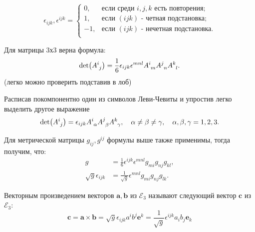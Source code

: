 \begin{definition}
	\begin{equation*}
		\epsilon_{ijk},\epsilon^{ijk} = \begin{cases}
			0, &\text{если среди $i,j,k$ есть повторения};\\
			1, &\text{если $(ijk)$ - четная подстановка};\\
			-1,&\text{если $(ijk)$ - нечетная подстановка}.\\
		\end{cases}
	\end{equation*}
\end{definition}

\begin{definition}[Определитель]
	Для матрицы 3х3 верна формула:
	\begin{equation*}
		\det(\tensor{A}{^i_j}) = \frac{1}{6}\epsilon_{ijk}\epsilon^{mnl}\tensor{A}{^i_m}\tensor{A}{^j_n}\tensor{A}{^k_l}.
	\end{equation*}
	(легко можно проверить подставив в лоб)
	
	Расписав покомпонентно один из символов Леви-Чевиты и упростив легко выделить другое выражение
	\begin{equation*}
		\det(\tensor{A}{^i_j}) = \epsilon_{ijk}\tensor{A}{^i_\alpha}\tensor{A}{^j_\beta}\tensor{A}{^k_\gamma},\quad \alpha\neq\beta\neq\gamma,\quad\alpha,\beta,\gamma=1,2,3.
	\end{equation*}
\end{definition}

Для метрической матрицы $g_{ij}, g^{ij}$ формулы выше также применимы, тогда получим, что:
\begin{align*}
	g &= \frac{1}{6}\epsilon^{ijk}\epsilon^{mnl}g_{mi}g_{nj}g_{kl},\\
	\sqrt{g}\epsilon_{ijk}&=\frac{1}{\sqrt{g}}\epsilon^{mnl}g_{mi}g_{nj}g_{lk}.
\end{align*}

\begin{definition}
	Векторным произведением векторов $\mathbf{a}, \mathbf{b}$ из $\mathcal{E}_3$ называют следующий вектор $\mathbf{c}$ из $\mathcal{E}_3$:
	\begin{equation*}
		\mathbf{c} = \mathbf{a} \times \mathbf{b} = \sqrt{g} \epsilon_{ijk} a^ib^j\mathbf{e}^k = \frac{1}{\sqrt{g}}\epsilon^{ijk} a_ib_j\mathbf{e}_k
	\end{equation*}
\end{definition}

